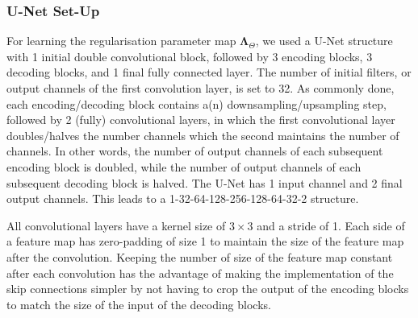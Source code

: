 \documentclass[12pt]{article}
\begin{document}
  





\subsubsection{U-Net Set-Up}

For learning the regularisation parameter map $\mathbf{\Lambda}_{\Theta}$, we used a U-Net structure with 1 initial double convolutional block, followed by 3 encoding blocks, 3 decoding blocks, and 1 final fully connected layer.
The number of initial filters, or output channels of the first convolution layer, is set to 32.
As commonly done, each encoding/decoding block contains a(n) downsampling/upsampling step, followed by 2 (fully) convolutional layers, in which the first convolutional layer doubles/halves the number channels which the second maintains the number of channels.
In other words, the number of output channels of each subsequent encoding block is doubled, while the number of output channels of each subsequent decoding block is halved.
The U-Net has 1 input channel and 2 final output channels.
This leads to a 1-32-64-128-256-128-64-32-2 structure.

All convolutional layers have a kernel size of $3 \times 3$ and a stride of 1.
Each side of a feature map has zero-padding of size 1 to maintain the size of the feature map after the convolution.
Keeping the number of size of the feature map constant after each convolution has the advantage of making the implementation of the skip connections simpler by not having to crop the output of the encoding blocks to match the size of the input of the decoding blocks.
\end{document}
